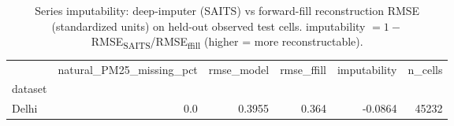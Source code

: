 \begin{table}
\caption{Series imputability: deep-imputer (SAITS) vs forward-fill reconstruction RMSE (standardized units) on held-out observed test cells. imputability $= 1 - $ RMSE\textsubscript{SAITS}/RMSE\textsubscript{ffill} (higher = more reconstructable).}
\label{tab:imputability}
\begin{tabular}{lrrrrr}
\toprule
 & natural\_PM25\_missing\_pct & rmse\_model & rmse\_ffill & imputability & n\_cells \\
dataset &  &  &  &  &  \\
\midrule
Delhi & 0.0 & 0.3955 & 0.364 & -0.0864 & 45232 \\
\bottomrule
\end{tabular}
\end{table}
